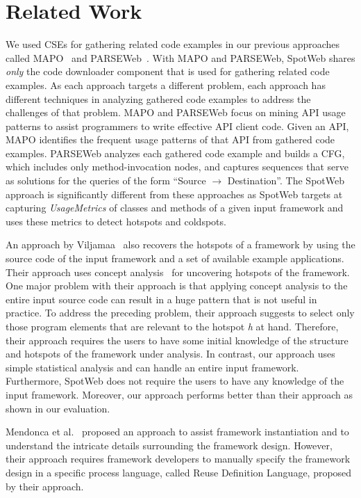 \section {Related Work}
\label{sec:related}
We used CSEs for gathering related code examples in our 
previous approaches called MAPO~\cite{mapo:xie} and PARSEWeb~\cite{thummalapenta07:parseweb}.
With MAPO and PARSEWeb, SpotWeb shares \emph{only} the code downloader component that is used for gathering
related code examples. As each approach targets
a different problem, each approach has different techniques 
in analyzing gathered code examples to address the
challenges of that problem. MAPO and PARSEWeb focus on mining
API usage patterns to assist programmers to write effective API client code.
Given an API, MAPO identifies the frequent usage patterns of that API from
gathered code examples. PARSEWeb analyzes each gathered code example and builds
a CFG, which includes only method-invocation nodes, and captures sequences
that serve as solutions for the queries of the form ``Source $\rightarrow$ Destination''.
The SpotWeb approach is significantly different from these approaches as SpotWeb targets at capturing
\emph{UsageMetrics} of classes and methods of a given input framework and uses
these metrics to detect hotspots and coldspots.

An approach by Viljamaa~\cite{viljamaa:reverse} also recovers the hotspots of a framework
by using the source code of the input framework and a set of available example applications. Their approach
uses concept analysis~\cite{ganter:concept} for uncovering hotspots of the framework. One major
problem with their approach is that applying concept analysis to the entire input source code
can result in a huge pattern that is not useful in practice. To
address the preceding problem, their approach 
suggests to select only those program elements 
that are relevant to the hotspot \emph{h} at hand. Therefore, their
approach requires the users to have some initial knowledge of the structure
and hotspots of the framework under analysis. In contrast,
our approach uses simple statistical analysis and can handle an entire input
framework. Furthermore, SpotWeb does not require
the users to have any knowledge of the input framework. Moreover,
our approach performs better than their approach as shown in our evaluation.

Mendonca et al.~\cite{mendoca:instantiation} proposed an approach to
assist framework instantiation and to understand the intricate
details surrounding the framework design.
However, their approach requires framework developers to
manually specify the framework design in a specific process
language, called Reuse Definition Language, proposed by their approach.

